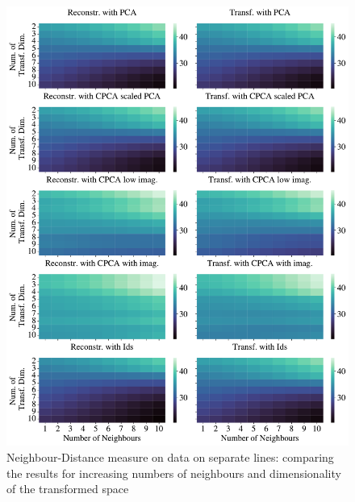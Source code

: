 \documentclass[pdftex,12pt,a4paper]{report}
\begin{document}
\begin{figure}
    \includegraphics[width = \textwidth]{images/multiple_runs/cpca/sep_lines/num_neigh_vs_dyn_low/euclidean_10runs_5lines_100points_10neighbours.pdf}
    \caption{Neighbour-Distance measure on data on separate lines: comparing the results for increasing numbers of neighbours and dimensionality of the transformed space} \label{fig:cpca-num_neigh_vs_dyn_low-seplines-euclidean}
\end{figure}
\end{document}
